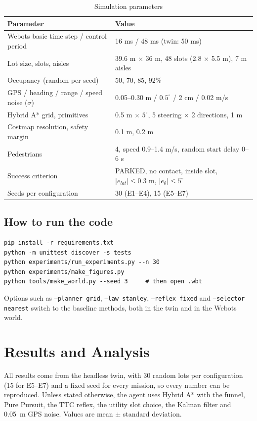 \documentclass[12pt,a4paper]{article}
\begin{document}
\begin{table}[!htbp]
\centering
\caption{Simulation parameters}
\label{tab:simparams}
\renewcommand{\arraystretch}{1.2}
\begin{tabular}{|P{6.2cm}|P{7.2cm}|}
\hline
\textbf{Parameter} & \textbf{Value} \\ \hline
Webots basic time step / control period & 16 ms / 48 ms (twin: 50 ms) \\ \hline
Lot size, slots, aisles & 39.6 m $\times$ 36 m, 48 slots (2.8 $\times$ 5.5 m), 7 m aisles \\ \hline
Occupancy (random per seed) & 50, 70, 85, 92\% \\ \hline
GPS / heading / range / speed noise ($\sigma$) & 0.05--0.30 m / $0.5^\circ$ / 2 cm / 0.02 m/s \\ \hline
Hybrid A* grid, primitives & 0.5 m $\times$ $5^\circ$, 5 steering $\times$ 2 directions, 1 m \\ \hline
Costmap resolution, safety margin & 0.1 m, 0.2 m \\ \hline
Pedestrians & 4, speed 0.9--1.4 m/s, random start delay 0--6 s \\ \hline
Success criterion & PARKED, no contact, inside slot, $|e_{lat}| \le 0.3$ m, $|e_\theta| \le 5^\circ$ \\ \hline
Seeds per configuration & 30 (E1--E4), 15 (E5--E7) \\ \hline
\end{tabular}
\end{table}

\subsection{How to run the code}
\begin{verbatim}
pip install -r requirements.txt
python -m unittest discover -s tests
python experiments/run_experiments.py --n 30
python experiments/make_figures.py
python tools/make_world.py --seed 3     # then open .wbt
\end{verbatim}
Options such as \texttt{--planner grid}, \texttt{--law stanley}, \texttt{--reflex fixed} and \texttt{--selector nearest} switch to the baseline methods, both in the twin and in the Webots world.

\section{Results and Analysis}
All results come from the headless twin, with 30 random lots per configuration (15 for E5--E7) and a fixed seed for every mission, so every number can be reproduced. Unless stated otherwise, the agent uses Hybrid A* with the funnel, Pure Pursuit, the TTC reflex, the utility slot choice, the Kalman filter and 0.05~m GPS noise. Values are mean $\pm$ standard deviation.
\end{document}
